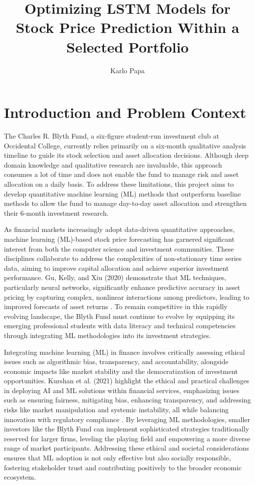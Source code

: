 \documentclass[10pt,twocolumn]{article}
\title{Optimizing LSTM Models for Stock Price Prediction Within a Selected Portfolio}
\author{Karlo Papa}
\affiliation{Occidental College}
\begin{document}
\maketitle

\section{Introduction and Problem Context}
The Charles R. Blyth Fund, a six-figure student-run investment club at Occidental College, currently relies primarily on a six-month qualitative analysis timeline to guide its stock selection and asset allocation decisions. Although deep domain knowledge and qualitative research are invaluable, this approach consumes a lot of time and does not enable the fund to manage risk and asset allocation on a daily basis. To address these limitations, this project aims to develop quantitative machine learning (ML) methods that outperform baseline methods to allow the fund to manage day-to-day asset allocation and strengthen their 6-month investment research.

As financial markets increasingly adopt data-driven quantitative approaches, machine learning (ML)-based stock price forecasting has garnered significant interest from both the computer science and investment communities. These disciplines collaborate to address the complexities of non-stationary time series data, aiming to improve capital allocation and achieve superior investment performance. Gu, Kelly, and Xiu (2020) demonstrate that ML techniques, particularly neural networks, significantly enhance predictive accuracy in asset pricing by capturing complex, nonlinear interactions among predictors, leading to improved forecasts of asset returns \cite{Gu2020EmpiricalAssetPricing}. To remain competitive in this rapidly evolving landscape, the Blyth Fund must continue to evolve by equipping its emerging professional students with data literacy and technical competencies through integrating ML methodologies into its investment strategies.

Integrating machine learning (ML) in finance involves critically assessing ethical issues such as algorithmic bias, transparency, and accountability, alongside economic impacts like market stability and the democratization of investment opportunities. Kurshan et al. (2021) highlight the ethical and practical challenges in deploying AI and ML solutions within financial services, emphasizing issues such as ensuring fairness, mitigating bias, enhancing transparency, and addressing risks like market manipulation and systemic instability, all while balancing innovation with regulatory compliance \cite{Kurshan2021FairEthicalAI}. By leveraging ML methodologies, smaller investors like the Blyth Fund can implement sophisticated strategies traditionally reserved for larger firms, leveling the playing field and empowering a more diverse range of market participants. Addressing these ethical and societal considerations ensures that ML adoption is not only effective but also socially responsible, fostering stakeholder trust and contributing positively to the broader economic ecosystem.
\end{document}

